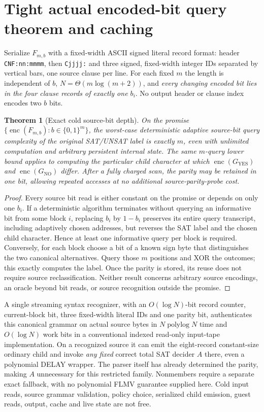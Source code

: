 \documentclass[11pt]{article}
\newtheorem{theorem}{Theorem}
\begin{document}
\section{Tight actual encoded-bit query theorem and caching}
Serialize $F_{m,b}$ with a fixed-width ASCII signed literal record format: header \texttt{CNF:nn:mmmm}, then \texttt{Cjjjj:} and three signed, fixed-width integer IDs separated by vertical bars, one source clause per line. For each fixed $m$ the length is independent of $b$, $N=\Theta(m\log(m+2))$, and \emph{every changing encoded bit lies in the four clause records of exactly one $b_i$}. No output header or clause index encodes two $b$ bits.
\begin{theorem}[Exact cold source-bit depth]
On the promise $\{\operatorname{enc}(F_{m,b}):b\in\{0,1\}^m\}$, the worst-case deterministic adaptive \emph{source-bit} query complexity of the original SAT/UNSAT label is exactly $m$, even with unlimited computation and arbitrary persistent internal state. The same $m$-query lower bound applies to computing the particular child character at which $\operatorname{enc}(G_{\mathrm{YES}})$ and $\operatorname{enc}(G_{\mathrm{NO}})$ differ. After a fully charged scan, the parity may be retained in one bit, allowing repeated accesses at no \emph{additional source-parity-probe} cost.
\end{theorem}
\begin{proof}
Every source bit read is either constant on the promise or depends on only one $b_i$. If a deterministic algorithm terminates without querying an informative bit from some block $i$, replacing $b_i$ by $1-b_i$ preserves its entire query transcript, including adaptively chosen addresses, but reverses the SAT label and the chosen child character. Hence at least one informative query per block is required. Conversely, for each block choose a bit of a known sign byte that distinguishes the two canonical alternatives. Query those $m$ positions and XOR the outcomes; this exactly computes the label. Once the parity is stored, its reuse does not require source reclassification. Neither result concerns arbitrary source encodings, an oracle beyond bit reads, or source recognition outside the promise.
\end{proof}
A single streaming syntax recognizer, with an $O(\log N)$-bit record counter, current-block bit, three fixed-width literal IDs and one parity bit, authenticates this canonical grammar on actual source bytes in $N\operatorname{polylog}N$ time and $O(\log N)$ work bits in a conventional indexed read-only input-tape implementation. On a recognized source it can emit the eight-record constant-size ordinary child and invoke \emph{any fixed} correct total SAT decider $A$ there, even a polynomial DELAY wrapper. The parser itself has already determined the parity, making $A$ unnecessary for this restricted family. Nonmembers require a separate exact fallback, with no polynomial FLMV guarantee supplied here. Cold input reads, source grammar validation, policy choice, serialized child emission, guest reads, output, cache and live state are not free.
\end{document}
